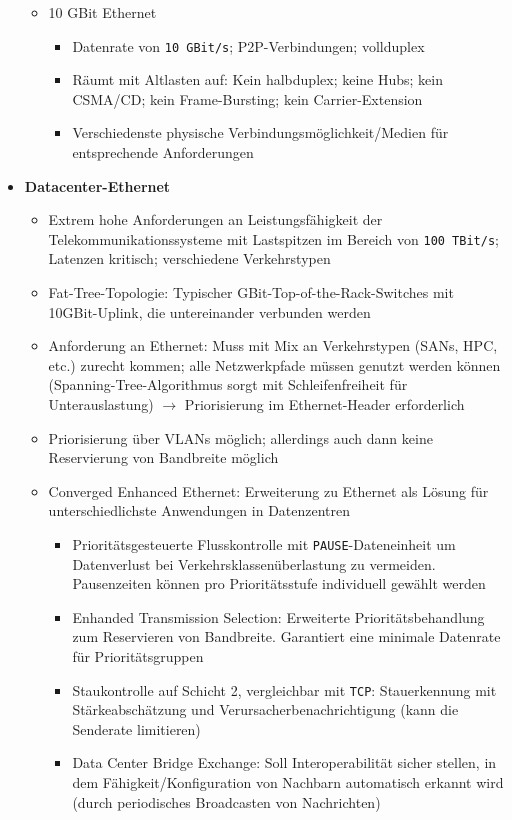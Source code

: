 \begin{itemize}
\begin{itemize}
		\item 10 GBit Ethernet
		\begin{itemize}
			\item Datenrate von \texttt{10 GBit/s}; P2P-Verbindungen; vollduplex
			\item Räumt mit Altlasten auf: Kein halbduplex; keine Hubs; kein CSMA/CD; kein Frame-Bursting; kein Carrier-Extension
			\item Verschiedenste physische Verbindungsmöglichkeit/Medien für entsprechende Anforderungen
		\end{itemize}
	\end{itemize}
	\item \textbf{Datacenter-Ethernet}
	\begin{itemize}
		\item Extrem hohe Anforderungen an Leistungsfähigkeit der Telekommunikationssysteme mit Lastspitzen im Bereich von \texttt{100 TBit/s}; Latenzen kritisch; verschiedene Verkehrstypen
		\item Fat-Tree-Topologie: Typischer GBit-Top-of-the-Rack-Switches mit 10GBit-Uplink, die untereinander verbunden werden
		\item Anforderung an Ethernet: Muss mit Mix an Verkehrstypen (SANs, HPC, etc.) zurecht kommen; alle Netzwerkpfade müssen genutzt werden können (Spanning-Tree-Algorithmus sorgt mit Schleifenfreiheit für Unterauslastung) \(\rightarrow\) Priorisierung im Ethernet-Header erforderlich
		\item Priorisierung über VLANs möglich; allerdings auch dann keine Reservierung von Bandbreite möglich
		\item Converged Enhanced Ethernet: Erweiterung zu Ethernet als Lösung für unterschiedlichste Anwendungen in Datenzentren
		\begin{itemize}
			\item Prioritätsgesteuerte Flusskontrolle mit \texttt{PAUSE}-Dateneinheit um Datenverlust bei Verkehrsklassenüberlastung zu vermeiden. Pausenzeiten können pro Prioritätsstufe individuell gewählt werden
			\item Enhanded Transmission Selection: Erweiterte Prioritätsbehandlung zum Reservieren von Bandbreite. Garantiert eine minimale Datenrate für Prioritätsgruppen
			\item Staukontrolle auf Schicht 2, vergleichbar mit \texttt{TCP}: Stauerkennung mit Stärkeabschätzung und Verursacherbenachrichtigung (kann die Senderate limitieren)
			\item Data Center Bridge Exchange: Soll Interoperabilität sicher stellen, in dem Fähigkeit/Konfiguration von Nachbarn automatisch erkannt wird (durch periodisches Broadcasten von Nachrichten)

\end{itemize}
\end{itemize}
\end{itemize}
